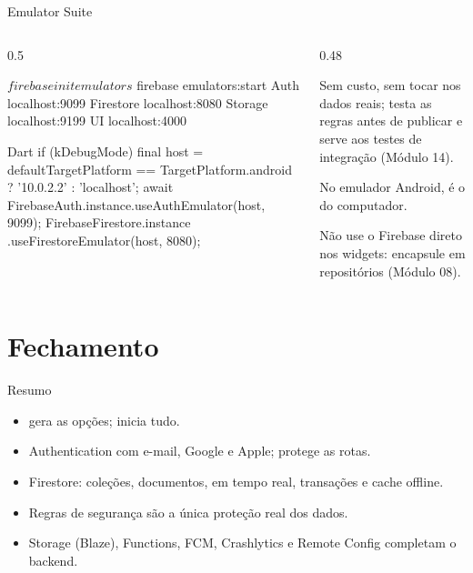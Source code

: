 \documentclass[aspectratio=169,10pt]{beamer}
\begin{document}
\begin{frame}[fragile]{Emulator Suite}
  \begin{columns}[T]
    \begin{column}{0.5\textwidth}
\begin{terminal}
$ firebase init emulators
$ firebase emulators:start
  Auth      localhost:9099
  Firestore localhost:8080
  Storage   localhost:9199
  UI        localhost:4000
\end{terminal}
\begin{codigo}[title=Apontando o app para o emulador]{Dart}
if (kDebugMode) {
  final host = defaultTargetPlatform ==
      TargetPlatform.android ? '10.0.2.2' : 'localhost';
  await FirebaseAuth.instance.useAuthEmulator(host, 9099);
  FirebaseFirestore.instance
      .useFirestoreEmulator(host, 8080);
}
\end{codigo}
    \end{column}
    \begin{column}{0.48\textwidth}
      \begin{conceito}[Vantagens]
        Sem custo, sem tocar nos dados reais; testa as regras antes de publicar e serve aos testes de integração (Módulo 14).
      \end{conceito}
      \begin{dica}
        No emulador Android,  é o  do computador.
      \end{dica}
      \begin{atencao}
        Não use o Firebase direto nos widgets: encapsule em repositórios (Módulo 08).
      \end{atencao}
    \end{column}
  \end{columns}
\end{frame}

\section{Fechamento}

\begin{frame}{Resumo}
  \begin{resumo}
    \begin{itemize}
      \item {} gera as opções;  inicia tudo.
      \item Authentication com e-mail, Google e Apple;  protege as rotas.
      \item Firestore: coleções, documentos,  em tempo real, transações e cache offline.
      \item Regras de segurança são a única proteção real dos dados.
      \item Storage (Blaze), Functions, FCM, Crashlytics e Remote Config completam o backend.
    \end{itemize}
  \end{resumo}
\end{frame}
\end{document}
